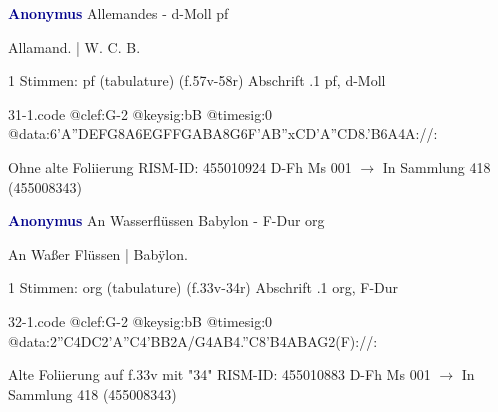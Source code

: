 \documentclass[twocolumn]{book}
\begin{document}
\newline \par \vspace{7pt} \textcolor{darkblue}{\textbf{Anonymus  }}
\newline Allemandes - d-Moll
\newline pf
\newline \begin{itshape}[f.57v, at left:] Allamand. | W. C. B.\end{itshape} 
\newline \textcolor{darkblue}{}  1 Stimmen: pf (tabulature)  (f.57v-58r)
\newline Abschrift
.1  pf, d-Moll  
\begin{filecontents*}{31-1.code}
@clef:G-2
@keysig:bB
@timesig:0
@data:6'A{''DEFG}{8A6EG}{FFGA}{BA8G}{6F'AB''xC}{D'A''CD}{8.'B6A}4A://:
\end{filecontents*}
\newline
%
\newline Ohne alte Foliierung
\newline RISM-ID: 455010924
\newline D-Fh  Ms 001
\newline $\rightarrow$ In Sammlung 418 (455008343)
      
\newline \par \vspace{7pt} \textcolor{darkblue}{\textbf{Anonymus  }}
\newline An Wasserflüssen Babylon - F-Dur
\newline org
\newline \begin{itshape}[f.33v, at left:] An Waßer Flüssen | Babÿlon.\end{itshape} 
\newline \textcolor{darkblue}{}  1 Stimmen: org (tabulature)  (f.33v-34r)
\newline Abschrift
.1  org, F-Dur  
\begin{filecontents*}{32-1.code}
@clef:G-2
@keysig:bB
@timesig:0
@data:2''C4DC2'A''C4'BB2A/G4AB4.''C8'B4ABAG2(F)://:
\end{filecontents*}
\newline
%
\newline Alte Foliierung auf f.33v mit "34"
\newline RISM-ID: 455010883
\newline D-Fh  Ms 001
\newline $\rightarrow$ In Sammlung 418 (455008343)
      
\end{document}
